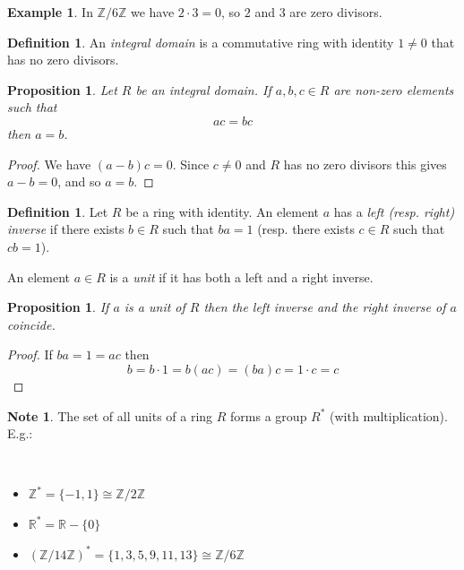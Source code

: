 \documentclass[12pt, letterpaper, oneside]{article}
\theoremstyle{plain}
\newtheorem{proposition}[theorem]{Proposition}
\theoremstyle{definition}
\newtheorem{definition}[theorem]{Definition}
\newtheorem{example}[theorem]{Example}
\newtheorem{note}[theorem]{Note}
\newcommand{\Z}{{\mathbb Z}}
\newcommand{\R}{{\mathbb R}}
\newcommand{\bit}{\begin{itemize}}
\newcommand{\eit}{\end{itemize}}
\newcommand{\vs}{\vskip 5mm}
\newcommand{\isep}[1][0]{\setlength{\itemsep}{#1 mm}}
\begin{document}
\vs\vs

\begin{example}
In $\Z/6\Z$ we have  $2\cdot 3 = 0$, so $2$ and $3$ are zero divisors.
\end{example}

\vs\vs


\begin{definition}
\label{DEF_INTDOMAIN}
An \emph{integral domain} is a commutative ring with identity $1\neq 0$ that has no zero divisors. 
\end{definition}

\vs\vs

\begin{proposition}
\label{PROP_CANCELPRINCIPDOMAIN}
Let $R$ be an integral domain. If $a, b, c\in R$ are non-zero elements such that
$$ac=bc$$
then $a=b$.
\end{proposition}

\vs

\begin{proof}
We have $(a-b)c=0$. Since $c\neq 0$ and $R$ has no zero divisors this gives $a-b =0$, 
and so $a=b$.
\end{proof}

\vs\vs 

\begin{definition}
Let $R$ be a ring with identity. An element $a$ has a \emph{left (resp. right) inverse} if there exists  
$b\in R$ such that $ba =1$ (resp. there exists $c\in R$ such that $cb=1$). 

An element $a\in R$ is a \emph{unit} if it has both a left and a right inverse. 
\end{definition}


\vs\vs

\begin{proposition}
If $a$ is a unit of $R$ then the left inverse and the right inverse of $a$ coincide.
\end{proposition}


\vs

\begin{proof}
If $ba = 1 = ac$ then  
$$b = b\cdot 1 = b(ac) = (ba)c = 1\cdot c = c$$
\end{proof}



\begin{note}
The set of all units of a ring $R$ forms a group $R^{\ast}$ (with multiplication). 
E.g.:

\vskip -15mm

\ 
\bit
\isep[-1]
\item[] $\Z^{\ast} = \{-1, 1\}\cong \Z/2\Z$
\item[] $\R^{\ast} = \R - \{0\}$
\item[] $(\Z/14\Z)^{\ast} = \{1, 3, 5, 9, 11, 13\} \cong \Z/6\Z$
\eit
\end{note}
\end{document}

